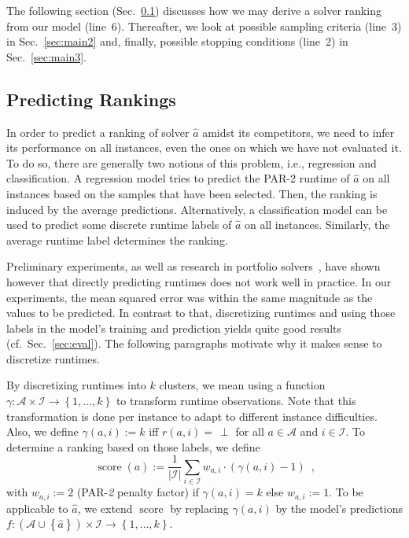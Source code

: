\documentclass[runningheads]{llncs}
\begin{document}
The following section (Sec.~\ref{sec:main1}) discusses how we may derive a solver ranking from our model (line~6).
Thereafter, we look at possible sampling criteria (line~3) in Sec.~\ref{sec:main2} and, finally, possible stopping conditions (line~2) in Sec.~\ref{sec:main3}.

\subsection{Predicting Rankings}
\label{sec:main1}
In order to predict a ranking of solver $\hat{a}$ amidst its competitors, we need to infer its performance on all instances, even the ones on which we have not evaluated it.
To do so, there are generally two notions of this problem, i.e., regression and classification.
A regression model tries to predict the \mbox{PAR-2} runtime of $\hat{a}$ on all instances based on the samples that have been selected.
Then, the ranking is induced by the average predictions.
Alternatively, a classification model can be used to predict some discrete runtime labels of $\hat{a}$ on all instances.
Similarly, the average runtime label determines the ranking.

Preliminary experiments, as well as research in portfolio solvers~\cite{NgokoCT19,CollauttiMMO13}, have shown however that directly predicting runtimes does not work well in practice.
In our experiments, the mean squared error was within the same magnitude as the values to be predicted.
In contrast to that, discretizing runtimes and using those labels in the model's training and prediction yields quite good results (cf.~Sec.~\ref{sec:eval}).
The following paragraphs motivate why it makes sense to discretize runtimes.

By discretizing runtimes into $k$ clusters, we mean using a function $\gamma\!: {\mathcal{A} \times \mathcal{I}} \rightarrow \left\lbrace 1, \dots, k \right\rbrace$ to transform runtime observations.
Note that this transformation is done per instance to adapt to different instance difficulties. 
Also, we define ${\gamma\!\left(a, i\right) := k}$ iff $r\!\left(a, i\right) = \,\perp$ for all $a \in \mathcal{A}$ and $i \in \mathcal{I}$.
To determine a ranking based on those labels, we define
\begin{equation}
  \operatorname{score}\!\left(a\right) := \frac{1}{|\mathcal{I}|} \sum_{i \in \mathcal{I}} w_{a,i} \cdot \left(\gamma\!\left(a, i\right) - 1\right) \enspace \textrm{,}
  \label{eq:rankingeq}
\end{equation}
with $w_{a,i} := 2$ (PAR-\textit{2} penalty factor) if $\gamma\!\left(a, i\right) = k$ else $w_{a,i} := 1$. To be applicable to $\hat{a}$, we extend $\operatorname{score}$ by replacing $\gamma\!\left(a, i\right)$ by the model's predictions $f\!: \left(\mathcal{A} \cup \left\lbrace \hat{a} \right\rbrace\right) \times \mathcal{I} \rightarrow \left\lbrace 1, \dots, k \right\rbrace$.
\end{document}
